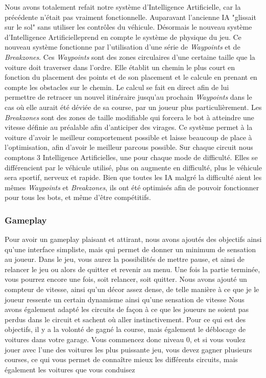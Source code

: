\documentclass[a4paper,12pt]{article}
\newcommand{\AI}{Intelligence Artificielle}
\begin{document}
            Nous avons totalement refait notre système d'\AI, car la précédente n'était pas vraiment fonctionnelle. Auparavant l'ancienne IA "glissait sur le sol" sans utiliser les contrôles du véhicule. Désormais le nouveau système d'\AI prend en compte le système de physique du jeu. Ce nouveau système fonctionne par l'utilisation d'une série de \textsl{Waypoints} et de \textsl{Breakzones}. Ces \textsl{Waypoints} sont des zones circulaires d'une certaine taille que la voiture doit traverser dans l'ordre. Elle établit un chemin le plus court en fonction du placement des points et de son placement et le calcule en prenant en compte les obstacles sur le chemin. Le calcul se fait en direct afin de lui permettre de retracer un nouvel itinéraire jusqu'au prochain \textsl{Waypoints} dans le cas où elle aurait été déviée de sa course, par un joueur plus particulièrement. Les \textsl{Breakzones} sont des zones de taille modifiable qui forcera le bot à atteindre une vitesse définie au préalable afin d'anticiper des virages. Ce système permet à la voiture d'avoir le meilleur comportement possible et laisse beaucoup de place à l'optimisation, afin d'avoir le meilleur parcous possible. Sur chaque circuit nous comptons 3 {\AI}s, une pour chaque mode de difficulté. Elles se différencient par le véhicule utilisé, plus on augmente en difficulté, plus le véhicule sera sportif, nerveux et rapide. Bien que toutes les IA malgré la difficulté aient les mêmes \textsl{Waypoints} et \textsl{Breakzones}, ils ont été optimisés afin de pouvoir fonctionner pour tous les bots, et même d'être compétitifs.
            
            \subsubsection{Gameplay}
            
            Pour avoir un gameplay plaisant et attirant, nous avons ajoutés des objectifs ainsi qu'une interface simpliste, mais qui permet de donner un minimum de sensation au joueur. Dans le jeu, vous aurez la possibilités de mettre pause, et ainsi de relancer le jeu ou alors de quitter et revenir au menu. Une fois la partie terminée, vous pourrez encore une fois, soit relancer, soit quitter. Nous avons ajouté un compteur de vitesse, ainsi qu'un décor assez dense, de telle manière à ce que je le joueur ressente un certain dynamisme ainsi qu'une sensation de vitesse Nous avons également adapté les circuits de façon à ce que les joueurs ne soient pas perdus dans le circuit et sachent où aller instinctivement. Pour ce qui est des objectifs, il y a la volonté de gagné la course, mais également le déblocage de voitures dans votre garage. Vous commencez donc niveau 0, et si vous voulez jouer avec l'une des voitures les plus puissante jeu, vous devez gagner plusieurs courses, ce qui vous permet de connaître mieux les différents circuits, mais également les voitures que vous conduisez   
            
\end{document}
